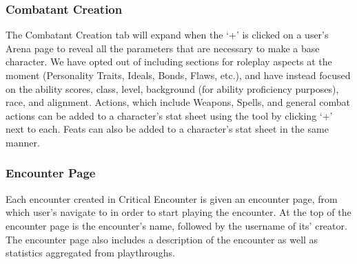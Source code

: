 \documentclass[letterpaper, 10 pt, conference]{ieeeconf}
\begin{document}
\subsubsection{Combatant Creation}
The Combatant Creation tab will expand when the ‘+’ is clicked on a
user’s Arena page to reveal all the parameters that are necessary to make a base
character. We have opted out of including sections for roleplay aspects at the
moment (Personality Traits, Ideals, Bonds, Flaws, etc.), and have instead focused
on the ability scores, class, level, background (for ability proficiency purposes),
race, and alignment. Actions, which include Weapons, Spells, and general combat
actions can be added to a character’s stat sheet using the tool by clicking ‘+’ next
to each. Feats can also be added to a character’s stat sheet in the same manner.
\subsubsection{Encounter Page}
Each encounter created in Critical Encounter is given an encounter page, from
which user’s navigate to in order to start playing the encounter. At the top of the
encounter page is the encounter’s name, followed by the username of its’ creator. The encounter page also includes a description of the encounter as well as statistics aggregated from playthroughs.
\end{document}
